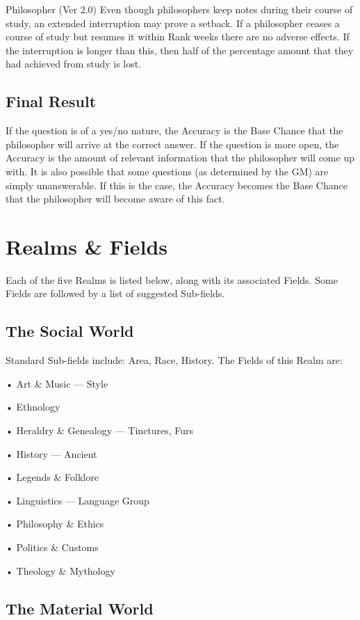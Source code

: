\begin{Chapter}{Philosopher (Ver 2.0)}
Even though philosophers keep notes during their course of study, an
extended interruption may prove a setback. If a philosopher ceases a
course of study but resumes it within Rank weeks there are no adverse
effects. If the interruption is longer than this, then half of the
percentage amount that they had achieved from study is lost.

\subsection{Final Result}

If the question is of a yes/no nature, the Accuracy is the Base Chance
that the philosopher will arrive at the correct answer. If the
question is more open, the Accuracy is the amount of relevant
information that the philosopher will come up with.  It is also
possible that some questions (as determined by the GM) are simply
unanswerable.  If this is the case, the Accuracy becomes the Base
Chance that the philosopher will become aware of this fact.

\section{Realms \& Fields}

Each of the five Realms is listed below, along with its associated
Fields.  Some Fields are followed by a list of suggested Sub-fields.

\subsection{The Social World}

Standard  Sub-fields  include:  Area,  Race,  History. 
The Fields of this Realm are:  

• Art \& Music — Style  

• Ethnology  

• Heraldry \& Genealogy — Tinctures, Furs  

• History — Ancient  

• Legends \& Folklore  

• Linguistics — Language Group  

• Philosophy \& Ethics  

• Politics \& Customs  

• Theology \& Mythology 

\subsection{The Material World}


\end{Chapter}

